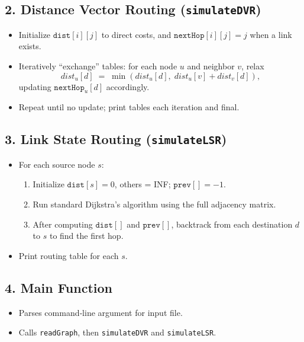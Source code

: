 \documentclass[12pt]{article}
\begin{document}
\subsection*{2. Distance Vector Routing (\texttt{simulateDVR})}
\begin{itemize}
  \item Initialize \(\texttt{dist}[i][j]\) to direct costs, and \(\texttt{nextHop}[i][j]=j\) when a link exists.
  \item Iteratively “exchange” tables: for each node \(u\) and neighbor \(v\), relax
    \[
      dist_u[d] \;=\;\min(dist_u[d],\;dist_u[v]+dist_v[d]),
    \]
    updating \(\texttt{nextHop}_u[d]\) accordingly.
  \item Repeat until no update; print tables each iteration and final.
\end{itemize}

\subsection*{3. Link State Routing (\texttt{simulateLSR})}
\begin{itemize}
  \item For each source node \(s\):
    \begin{enumerate}
      \item Initialize \(\texttt{dist}[s]=0\), others = INF; \(\texttt{prev}[]=-1\).
      \item Run standard Dijkstra’s algorithm using the full adjacency matrix.
      \item After computing \(\texttt{dist}[]\) and \(\texttt{prev}[]\), backtrack from each destination \(d\) to \(s\) to find the first hop.
    \end{enumerate}
  \item Print routing table for each \(s\).
\end{itemize}

\subsection*{4. Main Function}
\begin{itemize}
  \item Parses command‑line argument for input file.
  \item Calls \texttt{readGraph}, then \texttt{simulateDVR} and \texttt{simulateLSR}.
\end{itemize}
\end{document}
